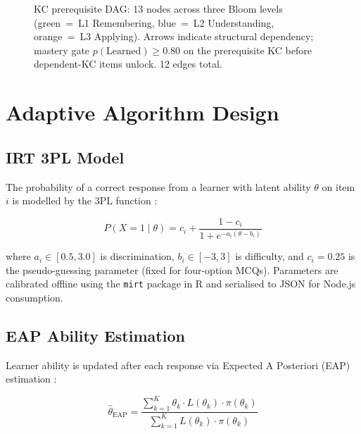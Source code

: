 \begin{figure}[H]
\caption{KC prerequisite DAG: 13 nodes across three Bloom levels
  (green~=~L1 Remembering, blue~=~L2 Understanding, orange~=~L3 Applying).
  Arrows indicate structural dependency; mastery gate
  $p(\text{Learned}) \geq 0.80$ on the prerequisite KC before
  dependent-KC items unlock. 12 edges total.}
\label{fig:kc_dag}
\end{figure}

\section{Adaptive Algorithm Design}
\label{sec:meth_algorithms}

\subsection{IRT 3PL Model}
\label{subsec:meth_irt}

The probability of a correct response from a learner with latent ability
$\theta$ on item $i$ is modelled by the 3PL function \parencite{birnbaum1968}:

\begin{equation}
  P(X=1 \mid \theta) = c_i + \frac{1-c_i}{1 + e^{-a_i(\theta - b_i)}}
  \label{eq:irt_3pl_meth}
\end{equation}

where $a_i \in [0.5, 3.0]$ is discrimination, $b_i \in [-3, 3]$ is difficulty,
and $c_i = 0.25$ is the pseudo-guessing parameter (fixed for four-option MCQs).
Parameters are calibrated offline using the \texttt{mirt} package in R
\parencite{chalmers2012} and serialised to JSON for Node.js consumption.

\subsection{EAP Ability Estimation}
\label{subsec:meth_eap}

Learner ability is updated after each response via Expected A Posteriori (EAP)
estimation \parencite{bock1982}:

\begin{equation}
  \hat{\theta}_{\text{EAP}} = \frac{\displaystyle\sum_{k=1}^{K}
    \theta_k \cdot L(\theta_k) \cdot \pi(\theta_k)}
    {\displaystyle\sum_{k=1}^{K} L(\theta_k) \cdot \pi(\theta_k)}
  \label{eq:eap_meth}
\end{equation}


